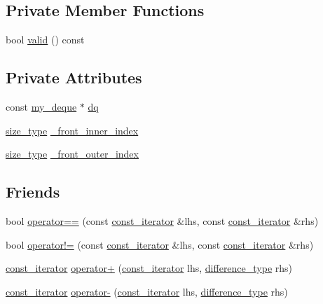\subsection*{Private Member Functions}
\begin{DoxyCompactItemize}
\item 
bool \hyperlink{classmy__deque_1_1const__iterator_ab233485f07a0be8dbc1b41987cc1af42}{valid} () const 
\end{DoxyCompactItemize}
\subsection*{Private Attributes}
\begin{DoxyCompactItemize}
\item 
const \hyperlink{classmy__deque}{my\-\_\-deque} $\ast$ \hyperlink{classmy__deque_1_1const__iterator_a9208064ba233965d385cda00a7410e2c}{dq}
\item 
\hyperlink{classmy__deque_a61e5e5317fe72a381ce4d45f09544b02}{size\-\_\-type} \hyperlink{classmy__deque_1_1const__iterator_a647322a455844b9a2cdc0fd93290b35a}{\-\_\-front\-\_\-inner\-\_\-index}
\item 
\hyperlink{classmy__deque_a61e5e5317fe72a381ce4d45f09544b02}{size\-\_\-type} \hyperlink{classmy__deque_1_1const__iterator_a8d175fd85f28e6628334f2b1eb12b815}{\-\_\-front\-\_\-outer\-\_\-index}
\end{DoxyCompactItemize}
\subsection*{Friends}
\begin{DoxyCompactItemize}
\item 
bool \hyperlink{classmy__deque_1_1const__iterator_a772a728ee48f5cb8904aaae842b0eb82}{operator==} (const \hyperlink{classmy__deque_1_1const__iterator}{const\-\_\-iterator} \&lhs, const \hyperlink{classmy__deque_1_1const__iterator}{const\-\_\-iterator} \&rhs)
\item 
bool \hyperlink{classmy__deque_1_1const__iterator_a12d66edf831aeec4957931d7f7945d90}{operator!=} (const \hyperlink{classmy__deque_1_1const__iterator}{const\-\_\-iterator} \&lhs, const \hyperlink{classmy__deque_1_1const__iterator}{const\-\_\-iterator} \&rhs)
\item 
\hyperlink{classmy__deque_1_1const__iterator}{const\-\_\-iterator} \hyperlink{classmy__deque_1_1const__iterator_ab6ce7b11eff6ef34762c30e4e96a86a0}{operator+} (\hyperlink{classmy__deque_1_1const__iterator}{const\-\_\-iterator} lhs, \hyperlink{classmy__deque_1_1const__iterator_abe3b655aa980c8a12ba486058464c91d}{difference\-\_\-type} rhs)
\item 
\hyperlink{classmy__deque_1_1const__iterator}{const\-\_\-iterator} \hyperlink{classmy__deque_1_1const__iterator_a41934331896eac6321161ff28c21fb29}{operator-\/} (\hyperlink{classmy__deque_1_1const__iterator}{const\-\_\-iterator} lhs, \hyperlink{classmy__deque_1_1const__iterator_abe3b655aa980c8a12ba486058464c91d}{difference\-\_\-type} rhs)
\end{DoxyCompactItemize}


